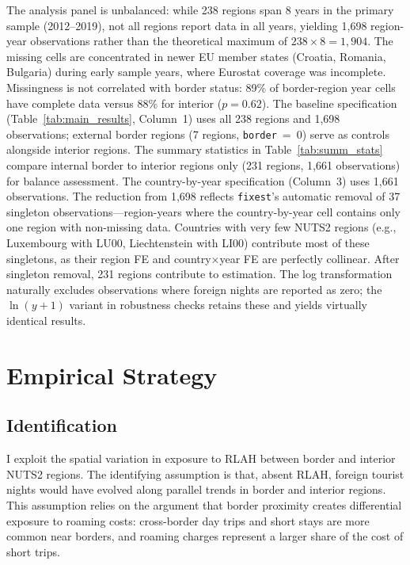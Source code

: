 \documentclass[12pt]{article}
\begin{document}
The analysis panel is unbalanced: while 238 regions span 8 years in the primary sample (2012--2019), not all regions report data in all years, yielding 1,698 region-year observations rather than the theoretical maximum of $238 \times 8 = 1,904$. The missing cells are concentrated in newer EU member states (Croatia, Romania, Bulgaria) during early sample years, where Eurostat coverage was incomplete. Missingness is not correlated with border status: 89\% of border-region year cells have complete data versus 88\% for interior ($p = 0.62$). The baseline specification (Table~\ref{tab:main_results}, Column~1) uses all 238 regions and 1,698 observations; external border regions (7 regions, \texttt{border}~=~0) serve as controls alongside interior regions. The summary statistics in Table~\ref{tab:summ_stats} compare internal border to interior regions only (231 regions, 1,661 observations) for balance assessment. The country-by-year specification (Column~3) uses 1,661 observations. The reduction from 1,698 reflects \texttt{fixest}'s automatic removal of 37 singleton observations---region-years where the country-by-year cell contains only one region with non-missing data. Countries with very few NUTS2 regions (e.g., Luxembourg with LU00, Liechtenstein with LI00) contribute most of these singletons, as their region FE and country$\times$year FE are perfectly collinear. After singleton removal, 231 regions contribute to estimation. The log transformation naturally excludes observations where foreign nights are reported as zero; the $\ln(y+1)$ variant in robustness checks retains these and yields virtually identical results.


\section{Empirical Strategy}

\subsection{Identification}

I exploit the spatial variation in exposure to RLAH between border and interior NUTS2 regions. The identifying assumption is that, absent RLAH, foreign tourist nights would have evolved along parallel trends in border and interior regions. This assumption relies on the argument that border proximity creates differential exposure to roaming costs: cross-border day trips and short stays are more common near borders, and roaming charges represent a larger share of the cost of short trips.
\end{document}
